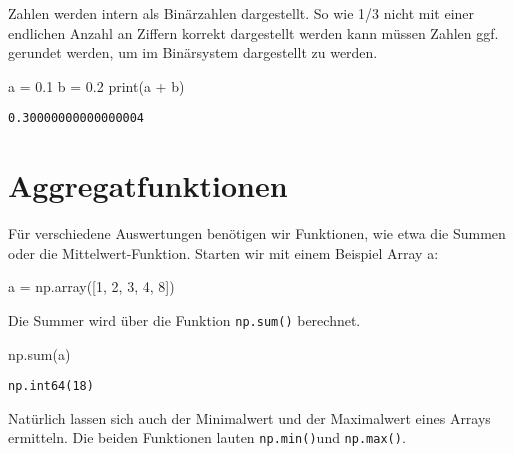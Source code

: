 \documentclass[
  letterpaper,
  DIV=11,
  numbers=noendperiod]{scrreprt}
\newenvironment{Shaded}{\begin{snugshade}}{\end{snugshade}}
\newcommand{\BuiltInTok}[1]{\textcolor[rgb]{0.00,0.23,0.31}{#1}}
\newcommand{\DecValTok}[1]{\textcolor[rgb]{0.68,0.00,0.00}{#1}}
\newcommand{\FloatTok}[1]{\textcolor[rgb]{0.68,0.00,0.00}{#1}}
\newcommand{\NormalTok}[1]{\textcolor[rgb]{0.00,0.23,0.31}{#1}}
\newcommand{\OperatorTok}[1]{\textcolor[rgb]{0.37,0.37,0.37}{#1}}
\begin{document}
\begin{tcolorbox}
\begin{tcolorbox}
Zahlen werden intern als Binärzahlen dargestellt. So wie 1/3 nicht mit
einer endlichen Anzahl an Ziffern korrekt dargestellt werden kann müssen
Zahlen ggf. gerundet werden, um im Binärsystem dargestellt zu werden.

\begin{Shaded}
\begin{Highlighting}[]
\NormalTok{a }\OperatorTok{=} \FloatTok{0.1}
\NormalTok{b }\OperatorTok{=} \FloatTok{0.2}
\BuiltInTok{print}\NormalTok{(a }\OperatorTok{+}\NormalTok{ b)}
\end{Highlighting}
\end{Shaded}

\begin{verbatim}
0.30000000000000004
\end{verbatim}

\end{tcolorbox}

\section{Aggregatfunktionen}\label{aggregatfunktionen}

Für verschiedene Auswertungen benötigen wir Funktionen, wie etwa die
Summen oder die Mittelwert-Funktion. Starten wir mit einem Beispiel
Array a:

\begin{Shaded}
\begin{Highlighting}[]
\NormalTok{a }\OperatorTok{=}\NormalTok{ np.array([}\DecValTok{1}\NormalTok{, }\DecValTok{2}\NormalTok{, }\DecValTok{3}\NormalTok{, }\DecValTok{4}\NormalTok{, }\DecValTok{8}\NormalTok{])}
\end{Highlighting}
\end{Shaded}

Die Summer wird über die Funktion \texttt{np.sum()} berechnet.

\begin{Shaded}
\begin{Highlighting}[]
\NormalTok{np.}\BuiltInTok{sum}\NormalTok{(a)}
\end{Highlighting}
\end{Shaded}

\begin{verbatim}
np.int64(18)
\end{verbatim}

Natürlich lassen sich auch der Minimalwert und der Maximalwert eines
Arrays ermitteln. Die beiden Funktionen lauten \texttt{np.min()}und
\texttt{np.max()}.


\end{tcolorbox}
\end{document}
